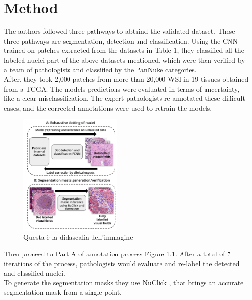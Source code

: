 \documentclass[target=bach,aauheader=,style=]{thud}
\begin{document}
\section{Method}
The authors followed three pathways to abtaind the validated dataset. These three pathways are segmentation, detection and classification. Using the CNN trained on patches extracted from the datasets in Table 1, they classified all the labeled nuclei part of the above datasets mentioned, which were then verified by a team of pathologists and classified by the PanNuke categories.\\
After, they took 2,000 patches from more than 20,000 WSI in 19 tissues obtained from a TCGA.
The models predictions were evaluated in terms of uncertainty, like a clear misclassification. The expert pathologists re-annotated these difficult cases, and the corrected annotations were used to retrain the models. 
\begin{figure}[h] %
    \centering
    \includegraphics[width=0.45\textwidth]{imgs/pannuke_annotations.png}
    \caption{Questa è la didascalia dell'immagine}
    \label{fig:esempio}
\end{figure}
Then proceed to Part A of annotation process Figure 1.1. After a total of 7 iterations of the process, pathologists would evaluate and re-label the detected and classified nuclei.\\
To generate the segmentation masks they use NuClick \cite{jahanifar2019nuclick}, that brings an accurate segmentation mask from a single point. 
\end{document}
